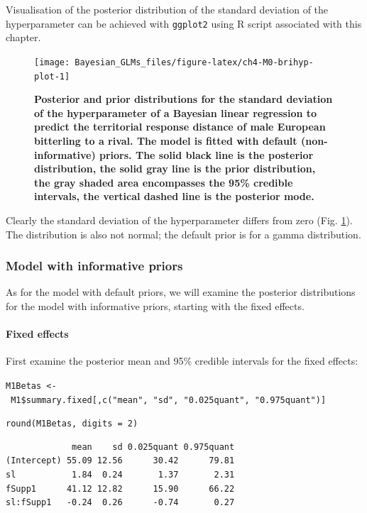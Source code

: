 \documentclass[
]{book}
\begin{document}
Visualisation of the posterior distribution of the standard deviation of the hyperparameter can be achieved with \texttt{ggplot2} using R script associated with this chapter.



\begin{figure}

{\centering \texttt{[image: Bayesian\_GLMs\_files/figure-latex/ch4-M0-brihyp-plot-1]} 

}

\caption{\textbf{Posterior and prior distributions for the standard deviation of the hyperparameter of a Bayesian linear regression to predict the territorial response distance of male European bitterling to a rival. The model is fitted with default (non-informative) priors. The solid black line is the posterior distribution, the solid gray line is the prior distribution, the gray shaded area encompasses the 95\% credible intervals, the vertical dashed line is the posterior mode.}}\label{fig:ch4-M0-brihyp-plot}
\end{figure}

Clearly the standard deviation of the hyperparameter differs from zero (Fig. \ref{fig:ch4-M0-brihyp-plot}). The distribution is also not normal; the default prior is for a gamma distribution.

\hypertarget{model-with-informative-priors}{%
\subsubsection{Model with informative priors}\label{model-with-informative-priors}}

As for the model with default priors, we will examine the posterior distributions for the model with informative priors, starting with the fixed effects.

\hypertarget{fixed-effects-1}{%
\paragraph{Fixed effects}\label{fixed-effects-1}}

First examine the posterior mean and 95\% credible intervals for the fixed effects:

\texttt{M1Betas\ \textless{}-\ M1\$summary.fixed{[},c("mean",\ "sd",\ "0.025quant",\ "0.975quant"){]}}

\texttt{round(M1Betas,\ digits\ =\ 2)}

\begin{verbatim}
             mean    sd 0.025quant 0.975quant
(Intercept) 55.09 12.56      30.42      79.81
sl           1.84  0.24       1.37       2.31
fSupp1      41.12 12.82      15.90      66.22
sl:fSupp1   -0.24  0.26      -0.74       0.27
\end{verbatim}
\end{document}
